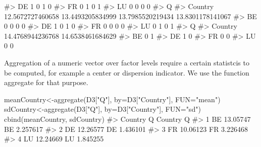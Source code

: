 \documentclass[
  letterpaper,
  DIV=11,
  numbers=noendperiod]{scrreprt}
\newenvironment{Shaded}{\begin{snugshade}}{\end{snugshade}}
\newcommand{\AttributeTok}[1]{\textcolor[rgb]{0.40,0.45,0.13}{#1}}
\newcommand{\CommentTok}[1]{\textcolor[rgb]{0.37,0.37,0.37}{#1}}
\newcommand{\FunctionTok}[1]{\textcolor[rgb]{0.28,0.35,0.67}{#1}}
\newcommand{\NormalTok}[1]{\textcolor[rgb]{0.00,0.23,0.31}{#1}}
\newcommand{\OtherTok}[1]{\textcolor[rgb]{0.00,0.23,0.31}{#1}}
\newcommand{\StringTok}[1]{\textcolor[rgb]{0.13,0.47,0.30}{#1}}
\begin{document}
\begin{Shaded}
\begin{Highlighting}[]
\CommentTok{\#\textgreater{}      DE                1               0                1                0}
\CommentTok{\#\textgreater{}      FR                0               1                0                1}
\CommentTok{\#\textgreater{}      LU                0               0                0                0}
\CommentTok{\#\textgreater{}        Q}
\CommentTok{\#\textgreater{} Country 12.5672727460658 13.4493205834999 13.7985520219434 13.8301178141067}
\CommentTok{\#\textgreater{}      BE                0                0                0                0}
\CommentTok{\#\textgreater{}      DE                1                0                1                0}
\CommentTok{\#\textgreater{}      FR                0                0                0                0}
\CommentTok{\#\textgreater{}      LU                0                1                0                1}
\CommentTok{\#\textgreater{}        Q}
\CommentTok{\#\textgreater{} Country 14.4768944236768 14.6538461684629}
\CommentTok{\#\textgreater{}      BE                0                1}
\CommentTok{\#\textgreater{}      DE                1                0}
\CommentTok{\#\textgreater{}      FR                0                0}
\CommentTok{\#\textgreater{}      LU                0                0}
\end{Highlighting}
\end{Shaded}

Aggregation of a numeric vector over factor levels require a certain
statistcis to be computed, for example a center or dispersion indicator.
We use the function aggregate for that purpose.

\begin{Shaded}
\begin{Highlighting}[]
\NormalTok{meanCountry}\OtherTok{\textless{}{-}}\FunctionTok{aggregate}\NormalTok{(D3[}\StringTok{"Q"}\NormalTok{], }\AttributeTok{by=}\NormalTok{D3[}\StringTok{"Country"}\NormalTok{], }\AttributeTok{FUN=}\StringTok{"mean"}\NormalTok{)}
\NormalTok{sdCountry}\OtherTok{\textless{}{-}}\FunctionTok{aggregate}\NormalTok{(D3[}\StringTok{"Q"}\NormalTok{], }\AttributeTok{by=}\NormalTok{D3[}\StringTok{"Country"}\NormalTok{], }\AttributeTok{FUN=}\StringTok{"sd"}\NormalTok{)}
\FunctionTok{cbind}\NormalTok{(meanCountry, sdCountry)}
\CommentTok{\#\textgreater{}   Country        Q Country        Q}
\CommentTok{\#\textgreater{} 1      BE 13.05747      BE 2.257617}
\CommentTok{\#\textgreater{} 2      DE 12.26577      DE 1.436101}
\CommentTok{\#\textgreater{} 3      FR 10.06123      FR 3.226468}
\CommentTok{\#\textgreater{} 4      LU 12.24669      LU 1.845255}
\end{Highlighting}
\end{Shaded}
\end{document}
